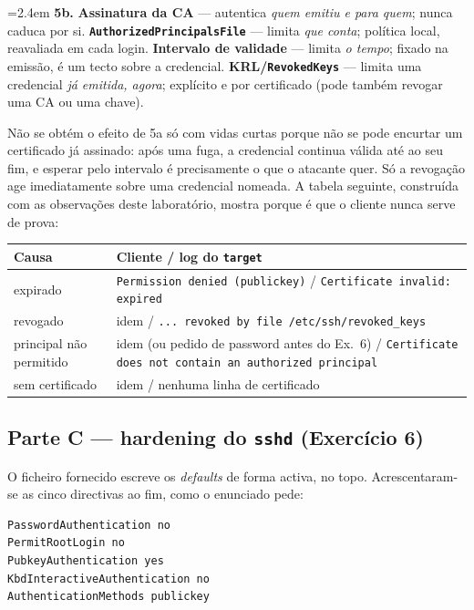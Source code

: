 \documentclass[a4paper,11pt]{article}
\newenvironment{answer}[1]{%
  \par\addvspace{7pt}\noindent
  \hangindent=2.4em\hangafter=1
  {\color{sscnblue}\bfseries #1\hspace{0.55em}}\ignorespaces}
  {\par\addvspace{5pt}}
\newcommand{\cmd}[1]{\textcolor{sscnblue}{\texttt{#1}}}
\begin{document}
\begin{answer}{5b.}
\textbf{Assinatura da CA} --- autentica \emph{quem emitiu e para quem}; nunca caduca por
si. \textbf{\cmd{AuthorizedPrincipalsFile}} --- limita \emph{que conta}; pol\'itica local,
reavaliada em cada login. \textbf{Intervalo de validade} --- limita \emph{o tempo}; fixado
na emiss\~ao, \'e um tecto sobre a credencial. \textbf{KRL/\cmd{RevokedKeys}} --- limita
uma credencial \emph{j\'a emitida, agora}; expl\'icito e por certificado (pode tamb\'em
revogar uma CA ou uma chave).

N\~ao se obt\'em o efeito de 5a s\'o com vidas curtas porque n\~ao se pode encurtar um
certificado j\'a assinado: ap\'os uma fuga, a credencial continua v\'alida at\'e ao seu
fim, e esperar pelo intervalo \'e precisamente o que o atacante quer. S\'o a revoga\c{c}\~ao
age imediatamente sobre uma credencial nomeada. A tabela seguinte, constru\'ida com as
observa\c{c}\~oes deste laborat\'orio, mostra porque \'e que o cliente nunca serve de
prova:

\begin{center}\small
\begin{tabularx}{\linewidth}{@{}>{\raggedright\arraybackslash}p{3.2cm} X@{}}
\toprule
\textbf{Causa} & \textbf{Cliente / log do \cmd{target}} \\
\midrule
expirado & \cmd{Permission denied (publickey)} / \cmd{Certificate invalid: expired} \\
revogado & idem / \cmd{... revoked by file /etc/ssh/revoked\_keys} \\
principal n\~ao permitido & idem (ou pedido de password antes do Ex.\ 6) /
  \cmd{Certificate does not contain an authorized principal} \\
sem certificado & idem / nenhuma linha de certificado \\
\bottomrule
\end{tabularx}
\end{center}
\end{answer}

\subsection{Parte C --- hardening do \cmd{sshd} (Exerc\'icio 6)}

O ficheiro fornecido escreve os \emph{defaults} de forma activa, no topo. Acrescentaram-se
as cinco directivas ao fim, como o enunciado pede:

\begin{lstlisting}
PasswordAuthentication no
PermitRootLogin no
PubkeyAuthentication yes
KbdInteractiveAuthentication no
AuthenticationMethods publickey
\end{lstlisting}
\end{document}
